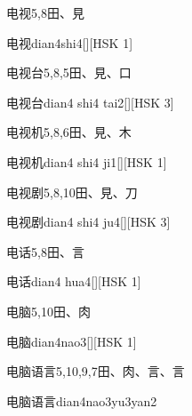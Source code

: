 \begin{entry}{电视}{5,8}{⽥、⾒}
  \begin{phonetics}{电视}{dian4shi4}[][HSK 1]
  \end{phonetics}
\end{entry}

\begin{entry}{电视台}{5,8,5}{⽥、⾒、⼝}
  \begin{phonetics}{电视台}{dian4 shi4 tai2}[][HSK 3]
  \end{phonetics}
\end{entry}

\begin{entry}{电视机}{5,8,6}{⽥、⾒、⽊}
  \begin{phonetics}{电视机}{dian4 shi4 ji1}[][HSK 1]
  \end{phonetics}
\end{entry}

\begin{entry}{电视剧}{5,8,10}{⽥、⾒、⼑}
  \begin{phonetics}{电视剧}{dian4 shi4 ju4}[][HSK 3]
  \end{phonetics}
\end{entry}

\begin{entry}{电话}{5,8}{⽥、⾔}
  \begin{phonetics}{电话}{dian4 hua4}[][HSK 1]
  \end{phonetics}
\end{entry}

\begin{entry}{电脑}{5,10}{⽥、⾁}
  \begin{phonetics}{电脑}{dian4nao3}[][HSK 1]
  \end{phonetics}
\end{entry}

\begin{entry}{电脑语言}{5,10,9,7}{⽥、⾁、⾔、⾔}
  \begin{phonetics}{电脑语言}{dian4nao3yu3yan2}
  \end{phonetics}
\end{entry}

